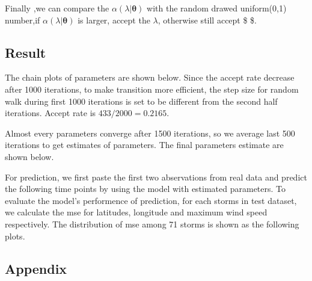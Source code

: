 \documentclass[]{article}
\begin{document}
Finally ,we can compare the \(\alpha(\lambda|\boldsymbol\theta)\) with
the random drawed uniform(0,1) number,if
\(\alpha(\lambda|\boldsymbol\theta)\) is larger, accept the \(\lambda\),
otherwise still accept \$ \theta\$.

\hypertarget{result}{%
\subsection{Result}\label{result}}

The chain plots of parameters are shown below. Since the accept rate
decrease after 1000 iterations, to make transition more efficient, the
step size for random walk during first 1000 iterations is set to be
different from the second half iterations. Accept rate is
\(433/2000=0.2165\).

Almost every parameters converge after 1500 iterations, so we average
last 500 iterations to get estimates of parameters. The final parameters
estimate are shown below.

For prediction, we first paste the first two abservations from real data
and predict the following time points by using the model with estimated
parameters. To evaluate the model's performence of prediction, for each
storms in test dataset, we calculate the mse for latitudes, longitude
and maximum wind speed respectively. The distribution of mse among 71
storms is shown as the following plots.

\hypertarget{appendix}{%
\subsection{Appendix}\label{appendix}}
\end{document}
